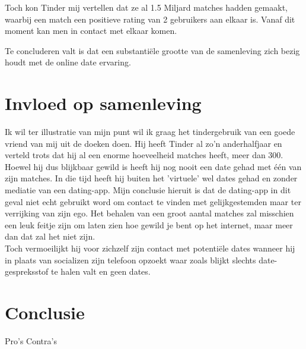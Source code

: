 \documentclass[pdftex,12pt,a4paper]{article}
\begin{document}
Toch kon Tinder mij vertellen dat ze al 1.5 Miljard matches hadden gemaakt, waarbij een match een positieve rating van 2 gebruikers aan elkaar is. Vanaf dit moment kan men in contact met elkaar komen. 

Te concluderen valt is dat  een substantiële grootte van de samenleving zich bezig houdt met de online date ervaring.

\section{Invloed op samenleving}
Ik wil ter illustratie van mijn punt wil ik graag het tindergebruik van een goede vriend van mij uit de doeken doen. Hij heeft Tinder al zo'n anderhalfjaar en verteld trots dat hij al een enorme hoeveelheid matches heeft, meer dan 300. Hoewel hij dus blijkbaar gewild is heeft hij nog nooit een date gehad met één van zijn matches. In die tijd heeft hij buiten het 'virtuele' wel dates gehad en zonder mediatie van een dating-app. Mijn conclusie hieruit is dat de dating-app in dit geval niet echt gebruikt word om contact te vinden met gelijkgestemden maar ter verrijking van zijn ego. Het behalen van een groot aantal matches zal misschien een leuk feitje zijn om laten zien hoe gewild je bent op het internet, maar meer dan dat zal het niet zijn.\\
Toch vermoeilijkt hij voor zichzelf zijn contact met potentiële dates wanneer hij in plaats van socializen zijn telefoon opzoekt waar zoals blijkt slechts date-gespreksstof te halen valt en geen dates.
\section{Conclusie}
Pro's
Contra's

\end{document}
